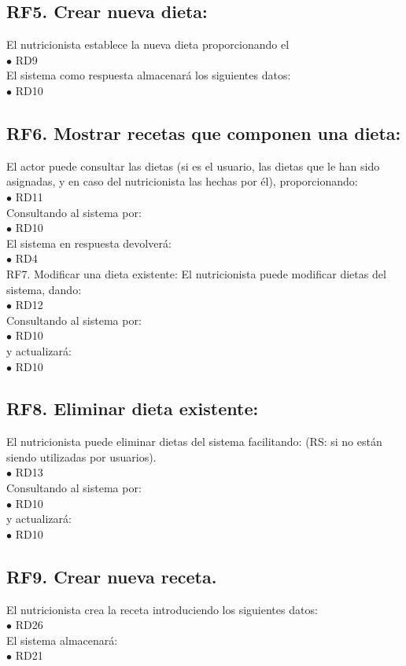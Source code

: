 \documentclass[12pt,letterpaper]{article}
\begin{document}
{\subsection{RF5. Crear nueva dieta:} El nutricionista establece la nueva dieta proporcionando el
\\ $\bullet$	RD9\\ 
El sistema como respuesta almacenará los siguientes datos:
\\ $\bullet$	RD10\\ 

\subsection{RF6. Mostrar recetas que componen una dieta:} El actor puede consultar las dietas (si es el usuario, las dietas que le han sido asignadas, y en caso del nutricionista las hechas por él), proporcionando:
\\ $\bullet$	RD11\\ 
Consultando al sistema por:
\\ $\bullet$	RD10\\ 
El sistema en respuesta devolverá:
\\ $\bullet$	RD4\\ 
RF7. Modificar una dieta existente: El nutricionista puede modificar dietas del sistema, dando:
\\ $\bullet$	RD12\\ 
Consultando al sistema por:
\\ $\bullet$	RD10\\ 
y actualizará:
\\ $\bullet$	RD10\\ 

\subsection{RF8. Eliminar dieta existente:} El nutricionista puede eliminar dietas del sistema facilitando: (RS: si no están siendo utilizadas por usuarios).
\\ $\bullet$	RD13\\ 
Consultando al sistema por:
\\ $\bullet$	RD10\\ 
y actualizará:
\\ $\bullet$	RD10\\ 

\subsection{RF9. Crear nueva receta.} El nutricionista crea la receta introduciendo los siguientes datos:
\\ $\bullet$	RD26\\ 
El sistema almacenará:
\\ $\bullet$	RD21\\ 

}
\end{document}
